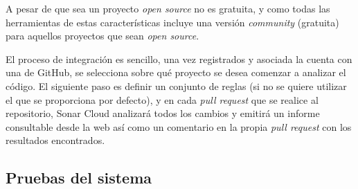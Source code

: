 A pesar de que sea un proyecto \textit{open source} no es gratuita, y como todas las herramientas de estas características incluye una versión \textit{community} (gratuita) para aquellos proyectos que sean \textit{open source}.

El proceso de integración es sencillo, una vez registrados y asociada la cuenta con una de GitHub, se selecciona sobre qué proyecto se desea comenzar a analizar el código. El siguiente paso es definir un conjunto de reglas (si no se quiere utilizar el que se proporciona por defecto), y en cada \textit{pull request} que se realice al repositorio, Sonar Cloud analizará todos los cambios y emitirá un informe consultable desde la web así como un comentario en la propia \textit{pull request} con los resultados encontrados.


\subsection{Pruebas del sistema}
